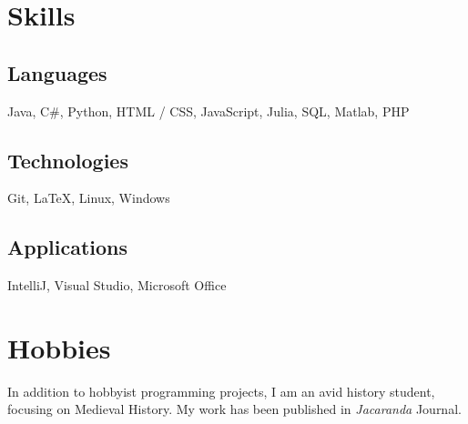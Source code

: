 \documentclass[a4paper]{article}
\newcommand{\accentcolour}{\color{NavyBlue}}
\newcommand{\resumesection}[1]{\section*{\accentcolour #1}}
\newcommand{\resumesubsection}[1]{\subsection*{\accentcolour #1}}
\begin{document}
\begin{paracol}{2}
\titlespacing*{\section}{0pt}{0.5ex}{1ex}
\resumesection{Skills}
\titlespacing*{\section}{0pt}{2.2ex}{1ex}
\resumesubsection{Languages}
Java, C\#, Python, HTML / CSS, JavaScript, Julia, SQL, Matlab, PHP
\resumesubsection{Technologies}
Git, \LaTeX, Linux, Windows
\resumesubsection{Applications}
IntelliJ, Visual Studio, Microsoft Office



\resumesection{Hobbies}
In addition to hobbyist programming projects, I am an avid history student, focusing on Medieval History.
My work has been published in \textit{Jacaranda} Journal.

\end{paracol}

\bigskip

\end{document}
